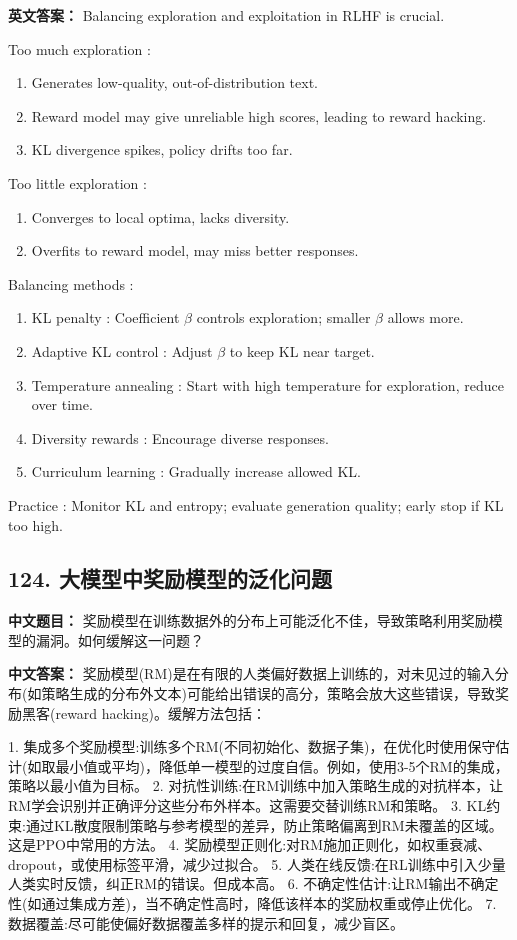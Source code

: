 \documentclass[10pt,a4paper]{ctexart}
\begin{document}
\textbf{英文答案：}  
Balancing exploration and exploitation in RLHF is crucial.

 Too much exploration :
\begin{enumerate}
    \item Generates low-quality, out-of-distribution text.
    \item Reward model may give unreliable high scores, leading to reward hacking.
    \item KL divergence spikes, policy drifts too far.
\end{enumerate}

 Too little exploration :
\begin{enumerate}
    \item Converges to local optima, lacks diversity.
    \item Overfits to reward model, may miss better responses.
\end{enumerate}

 Balancing methods :
\begin{enumerate}
    \item KL penalty : Coefficient \(\beta\) controls exploration; smaller \(\beta\) allows more.
    \item Adaptive KL control : Adjust \(\beta\) to keep KL near target.
    \item Temperature annealing : Start with high temperature for exploration, reduce over time.
    \item Diversity rewards : Encourage diverse responses.
    \item Curriculum learning : Gradually increase allowed KL.
\end{enumerate}

 Practice : Monitor KL and entropy; evaluate generation quality; early stop if KL too high.

\subsection*{124. 大模型中奖励模型的泛化问题}
\textbf{中文题目：} 奖励模型在训练数据外的分布上可能泛化不佳，导致策略利用奖励模型的漏洞。如何缓解这一问题？

\textbf{中文答案：}  
奖励模型(RM)是在有限的人类偏好数据上训练的，对未见过的输入分布(如策略生成的分布外文本)可能给出错误的高分，策略会放大这些错误，导致奖励黑客(reward hacking)。缓解方法包括：

1.  集成多个奖励模型:训练多个RM(不同初始化、数据子集)，在优化时使用保守估计(如取最小值或平均)，降低单一模型的过度自信。例如，使用3-5个RM的集成，策略以最小值为目标。
2.  对抗性训练:在RM训练中加入策略生成的对抗样本，让RM学会识别并正确评分这些分布外样本。这需要交替训练RM和策略。
3.  KL约束:通过KL散度限制策略与参考模型的差异，防止策略偏离到RM未覆盖的区域。这是PPO中常用的方法。
4.  奖励模型正则化:对RM施加正则化，如权重衰减、dropout，或使用标签平滑，减少过拟合。
5.  人类在线反馈:在RL训练中引入少量人类实时反馈，纠正RM的错误。但成本高。
6.  不确定性估计:让RM输出不确定性(如通过集成方差)，当不确定性高时，降低该样本的奖励权重或停止优化。
7.  数据覆盖:尽可能使偏好数据覆盖多样的提示和回复，减少盲区。
\end{document}
